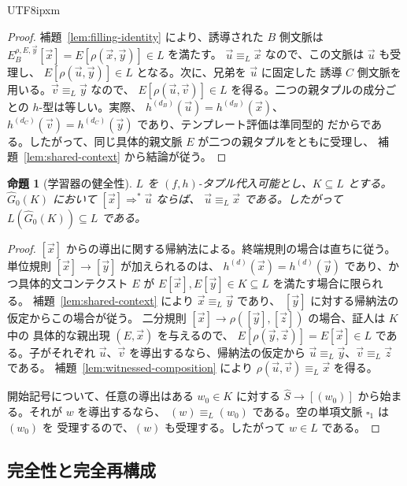 \documentclass[10pt,a4paper]{article}
\newtheorem{proposition}[theorem]{命題}
\theoremstyle{remark}
\newcommand{\tuple}[1]{\vec{#1}}
\newcommand{\blank}{\square}
\begin{document}
\begin{CJK}{UTF8}{ipxm}
\begin{proof}
補題~\ref{lem:filling-identity} により、誘導された \(B\) 側文脈は
\(E_B^{\rho,E,\tuple y}[\tuple x]=E[\rho(\tuple x,\tuple y)]\in L\) を満たす。
\(\tuple u\equiv_L\tuple x\) なので、この文脈は \(\tuple u\) も受理し、
\(E[\rho(\tuple u,\tuple y)]\in L\) となる。次に、兄弟を \(\tuple u\) に固定した
誘導 \(C\) 側文脈を用いる。\(\tuple v\equiv_L\tuple y\) なので、
\(E[\rho(\tuple u,\tuple v)]\in L\) を得る。二つの親タプルの成分ごとの
\(h\)-型は等しい。実際、
\(h^{(d_B)}(\tuple u)=h^{(d_B)}(\tuple x)\)、
\(h^{(d_C)}(\tuple v)=h^{(d_C)}(\tuple y)\) であり、テンプレート評価は準同型的
だからである。したがって、同じ具体的親文脈 \(E\) が二つの親タプルをともに受理し、
補題~\ref{lem:shared-context} から結論が従う。
\end{proof}

\begin{proposition}[学習器の健全性]
\label{prop:learner-soundness}
\(L\) を \((f,h)\)-タプル代入可能とし、\(K\subseteq L\) とする。
\(\widehat G_0(K)\) において \([\tuple x]\Rightarrow^*\tuple u\) ならば、
\(\tuple u\equiv_L\tuple x\) である。したがって
\(L(\widehat G_0(K))\subseteq L\) である。
\end{proposition}

\begin{proof}
\([\tuple x]\) からの導出に関する帰納法による。終端規則の場合は直ちに従う。
単位規則 \([\tuple x]\to[\tuple y]\) が加えられるのは、
\(h^{(d)}(\tuple x)=h^{(d)}(\tuple y)\) であり、かつ具体的文コンテクスト \(E\) が
\(E[\tuple x],E[\tuple y]\in K\subseteq L\) を満たす場合に限られる。
補題~\ref{lem:shared-context} により \(\tuple x\equiv_L\tuple y\) であり、
\([\tuple y]\) に対する帰納法の仮定からこの場合が従う。
二分規則 \([\tuple x]\to\rho([\tuple y],[\tuple z])\) の場合、証人は \(K\) 中の
具体的な親出現 \((E,\tuple x)\) を与えるので、
\(E[\rho(\tuple y,\tuple z)]=E[\tuple x]\in L\) である。子がそれぞれ
\(\tuple u\)、\(\tuple v\) を導出するなら、帰納法の仮定から
\(\tuple u\equiv_L\tuple y\)、\(\tuple v\equiv_L\tuple z\) である。
補題~\ref{lem:witnessed-composition} により
\(\rho(\tuple u,\tuple v)\equiv_L\tuple x\) を得る。

開始記号について、任意の導出はある \(w_0\in K\) に対する
\(\widehat S\to[(w_0)]\) から始まる。それが \(w\) を導出するなら、
\((w)\equiv_L(w_0)\) である。空の単項文脈 \(\blank_1\) は \((w_0)\) を
受理するので、\((w)\) も受理する。したがって \(w\in L\) である。
\end{proof}

\subsection{完全性と完全再構成}
\label{sec:completeness}


\end{CJK}
\end{document}
